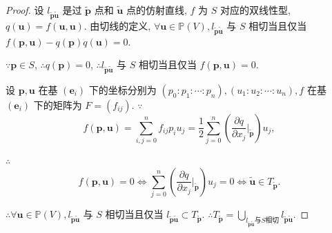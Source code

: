 \documentclass{ctexart}
\begin{document}
\begin{proof}
    设 $l_{\tilde{\boldsymbol{p}}\tilde{\boldsymbol{u}}}$ 是过 $\tilde{\boldsymbol{p}}$ 点和 $\tilde{\boldsymbol{u}}$ 点的仿射直线, $f$ 为 $S$ 对应的双线性型, $q(\boldsymbol{u})=f(\boldsymbol{u},\boldsymbol{u})$. 由切线的定义, $\forall\boldsymbol{u}\in\mathbb{P}(V),l_{\tilde{\boldsymbol{p}}\tilde{\boldsymbol{u}}}$ 与 $S$ 相切当且仅当 $f(\boldsymbol{p},\boldsymbol{u})-q(\boldsymbol{p})q(\boldsymbol{u})=0$.

    $\because\boldsymbol{p}\in S$, $\therefore q(\boldsymbol{p})=0$, $\therefore l_{\tilde{\boldsymbol{p}}\tilde{\boldsymbol{u}}}$ 与 $S$ 相切当且仅当 $f(\boldsymbol{p},\boldsymbol{u})=0$.

    设 $\boldsymbol{p},\boldsymbol{u}$ 在基 $(\boldsymbol{e}_i)$ 下的坐标分别为 $(p_0:p_1:\cdots:p_n),(u_1:u_2:\cdots:u_n),f$ 在基 $(\boldsymbol{e}_i)$ 下的矩阵为 $F=(f_{ij})$. $\because$
    \[f(\boldsymbol{p},\boldsymbol{u})=\sum\limits_{i,j=0}^nf_{ij}p_iu_j=\dfrac{1}{2}\sum\limits_{j=0}^n\left(\dfrac{\partial q}{\partial x_j}\bigg|_{\tilde{\boldsymbol{p}}}\right)u_j,\]

    $\therefore$
    \[f(\boldsymbol{p},\boldsymbol{u})=0\Leftrightarrow\sum\limits_{j=0}^n\left(\dfrac{\partial q}{\partial x_j}\bigg|_{\tilde{\boldsymbol{p}}}\right)u_j=0\Leftrightarrow\tilde{\boldsymbol{u}}\in T_{\tilde{\boldsymbol{p}}}.\]

    $\therefore\forall\boldsymbol{u}\in\mathbb{P}(V),l_{\tilde{\boldsymbol{p}}\tilde{\boldsymbol{u}}}$ 与 $S$ 相切当且仅当 $l_{\tilde{\boldsymbol{p}}\tilde{\boldsymbol{u}}}\subset T_{\tilde{\boldsymbol{p}}}$. $\therefore T_{\tilde{\boldsymbol{p}}}=\bigcup\limits_{l_{\tilde{\boldsymbol{p}}\tilde{\boldsymbol{u}}}\text{与}S\text{相切}}l_{\tilde{\boldsymbol{p}}\tilde{\boldsymbol{u}}}$.
\end{proof}
\end{document}
